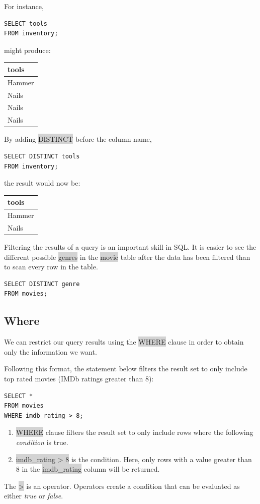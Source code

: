 \documentclass[11pt]{article}
\begin{document}
For instance,
\begin{lstlisting}
SELECT tools 
FROM inventory;
\end{lstlisting}
might produce:

{
\begin{tabular}{ | m{45em} | }
\hline
tools \\
\hline
Hammer \\
\hline
Nails \\
\hline 
Nails \\
\hline 
Nails \\
\hline
\end{tabular}

By adding \colorbox{lightgray}{DISTINCT} before the column name,
\begin{lstlisting}
SELECT DISTINCT tools 
FROM inventory;
\end{lstlisting}
the result would now be:

{
\begin{tabular}{ | m{45em} | }
\hline
tools \\
\hline 
Hammer \\
\hline
Nails \\
\hline 
\end{tabular} 

Filtering the results of a query is an important skill in SQL. It is easier to see the different possible \colorbox{lightgray}{genres} in the \colorbox{lightgray}{movie} table after the data has been filtered than to scan every row in the table.
\begin{lstlisting}
SELECT DISTINCT genre 
FROM movies; 
\end{lstlisting}

\subsection{Where}
We can restrict our query results using the \colorbox{lightgray}{WHERE} clause in order to obtain only the information we want.

Following this format, the statement below filters the result set to only include top rated movies (IMDb ratings greater than 8):
\begin{lstlisting}
SELECT *
FROM movies
WHERE imdb_rating > 8;
\end{lstlisting}
\begin{enumerate}[leftmargin = *]
\item \colorbox{lightgray}{WHERE} clause filters the result set to only include rows where the following \textit{condition} is true.
\item \colorbox{lightgray}{imdb\_rating > 8} is the condition. Here, only rows with a value greater than 8 in the \colorbox{lightgray}{imdb\_rating} column will be returned.
\end{enumerate}
The \colorbox{lightgray}{>} is an operator. Operators create a condition that can be evaluated as either \textit{true} or \textit{false}.

}}
\end{document}
